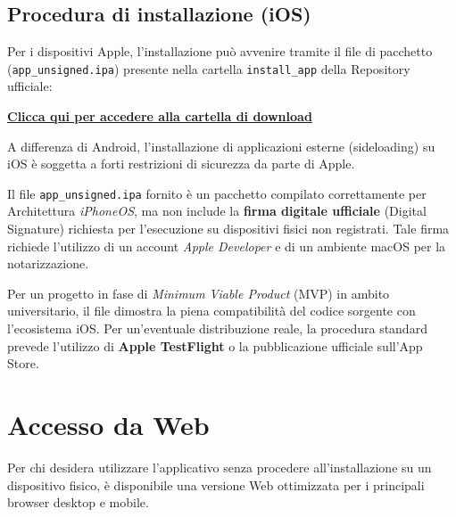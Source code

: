\documentclass[a4paper,12pt]{article}
\begin{document}
\subsection{Procedura di installazione (iOS)}
Per i dispositivi Apple, l'installazione può avvenire tramite il file di pacchetto (\texttt{app\_unsigned.ipa}) presente nella cartella \texttt{install\_app} della Repository ufficiale:

\begin{center}
    \begin{tcolorbox}[colback=orange!10!white,colframe=orange!80!black,width=0.8\textwidth,arc=3mm,auto outer arc, center title, title=\textbf{SCARICA L'APP (IPA)}]
        \centering \href{https://github.com/SWE-BitByBit/project-MVP/tree/main/install_app}{\textbf{Clicca qui per accedere alla cartella di download}}
    \end{tcolorbox}
\end{center}

\begin{tcolorbox}[colback=orange!5!white,colframe=orange!75!black,title=Nota sulla compatibilità iOS]
    A differenza di Android, l'installazione di applicazioni esterne (sideloading) su iOS è soggetta a forti restrizioni di sicurezza da parte di Apple. 
    
    Il file \texttt{app\_unsigned.ipa} fornito è un pacchetto compilato correttamente per Architettura \textit{iPhoneOS}, ma non include la \textbf{firma digitale ufficiale} (Digital Signature) richiesta per l'esecuzione su dispositivi fisici non registrati. Tale firma richiede l'utilizzo di un account \textit{Apple Developer} e di un ambiente macOS per la notarizzazione.
    
    Per un progetto in fase di \textit{Minimum Viable Product} (MVP) in ambito universitario, il file dimostra la piena compatibilità del codice sorgente con l'ecosistema iOS. Per un'eventuale distribuzione reale, la procedura standard prevede l'utilizzo di \textbf{Apple TestFlight} o la pubblicazione ufficiale sull'App Store.
\end{tcolorbox}

\section{Accesso da Web} \label{sec:accesso_web}

Per chi desidera utilizzare l'applicativo senza procedere all'installazione su un dispositivo fisico, è disponibile una versione Web ottimizzata per i principali browser desktop e mobile.
\end{document}
